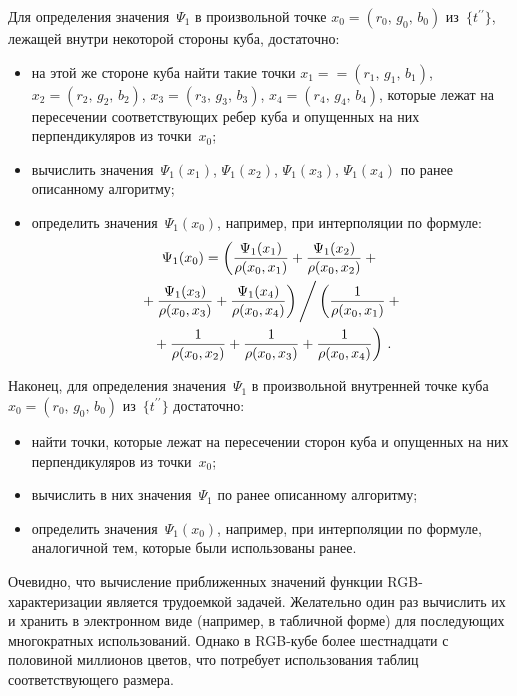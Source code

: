 \begin{multicols}{2}
  Для определения значения~$\Psi_1$ в произвольной точке $x_0 = 
(r_0,\,g_0,\,b_0)$ из~$\{t^{\prime\prime}\}$, лежащей внутри некоторой стороны 
куба, достаточно:
  \begin{itemize}
  \item на этой же стороне куба найти такие точки $x_1 =$\linebreak $= (r_1,\,g_1,\,b_1)$, 
$x_2=(r_2,\,g_2,\,b_2)$, $x_3=(r_3,\,g_3,\,b_3)$, $x_4=(r_4,\,g_4,\,b_4)$, которые 
лежат на пересечении соответствующих ребер куба и опущенных на них 
перпендикуляров из точки~$x_0$;
  \item вычислить значения~$\Psi_1(x_1)$, $\Psi_1(x_2)$, $\Psi_1(x_3)$, 
$\Psi_1(x_4)$ по ранее описанному алгоритму;
  \item определить значения~$\Psi_1(x_0)$, например, при интерполяции по 
формуле:
  \begin{multline*}
  \Psi_1(x_0)=
\left(\displaystyle\frac{\displaystyle \Psi_1(x_1)\mathstrut}{\displaystyle \rho(x_0, x_1)\mathstrut}+\displaystyle\frac{\displaystyle \Psi_1(x_2)\mathstrut}{\displaystyle  \rho(x_0, 
x_2)\mathstrut}+{}\right.\\
\left.{}+\displaystyle\frac{\displaystyle \Psi_1(x_3)\mathstrut}{\displaystyle  \rho(x_0, x_3)\mathstrut}+
\displaystyle\frac{\displaystyle \Psi_1(x_4)\mathstrut}{\displaystyle  \rho(x_0, 
x_4)\mathstrut}\right)\Bigg /  \left(\displaystyle\frac{\displaystyle 1\mathstrut}{\displaystyle \rho(x_0,x_1)\mathstrut}+{}\right.\\
\left.{}+\displaystyle\frac{\displaystyle 1\mathstrut}{\displaystyle \rho(x_0,x_2)\mathstrut}+\displaystyle\frac{\displaystyle 1\mathstrut}{\displaystyle \rho(x_0,x_3)\mathstrut}+\displaystyle\frac{\displaystyle 1\mathstrut}{\displaystyle \rho(x_0,x_4)\mathstrut}\right)\,.
  \end{multline*}
  \end{itemize}
  
  Наконец, для определения значения~$\Psi_1$ в произвольной внутренней 
точке куба $x_0=(r_0,\,g_0,\,b_0)$ из~$\{t^{\prime\prime}\}$ достаточно:
  \begin{itemize}
  \item найти точки, которые лежат на пересечении сторон куба и опущенных 
на них перпендикуляров из точки~$x_0$;
  \item вычислить в них значения~$\Psi_1$ по ранее описанному алгоритму;
  \item определить значения~$\Psi_1(x_0)$, например, при интерполяции по 
формуле, аналогичной тем, которые были использованы ранее.
  \end{itemize}
  
  Очевидно, что вычисление приближенных значений функции 
  RGB-ха\-рак\-те\-ри\-за\-ции является трудоемкой задачей. Желательно 
один раз вы\-чис\-лить их и хранить в электронном виде (например, в табличной 
форме) для последующих многократных использований. Однако в 
  RGB-ку\-бе более шестнадцати с половиной миллионов цветов, что 
потребует использования таблиц соответствующего размера. 
  

\end{multicols}
